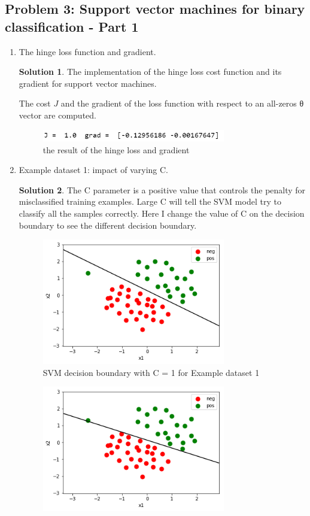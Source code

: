 \documentclass[]{book}
\theoremstyle{definition}
\newtheorem*{soln}{Solution}
\begin{document}
\subsection*{Problem 3: Support vector machines for binary classification - Part 1}
\begin{enumerate}
	\item The hinge loss function and gradient.
	\begin{soln}
	The implementation of  the hinge loss cost function and its gradient for support vector machines.
	
	The cost $J$ and the gradient of the loss function with respect to an all-zeros θ vector are computed.
	\begin{figure}[H]
		\centering
		\includegraphics[width=8cm]{j.png}
		\caption{the result of the hinge loss and gradient}
		\label{fig:1}
	\end{figure}
	\end{soln}
	\item Example dataset 1: impact of varying C.
	\begin{soln}
		The C parameter is a positive value that controls the penalty for misclassified training examples. Large C will tell the SVM model try to classify all the samples correctly. Here I change the value of C on the decision boundary to see the different decision boundary.
		\begin{figure}[H]
			\centering
			\includegraphics[width=8cm]{c1.png}
			\caption{SVM decision boundary with C = 1 for Example dataset 1}
			\label{fig:2}
		\end{figure}
		\begin{figure}[H]
			\centering
			\includegraphics[width=8cm]{c100.png}

\end{figure}
\end{soln}
\end{enumerate}
\end{document}
